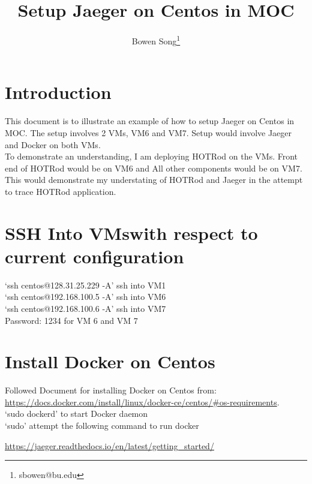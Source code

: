 \documentclass[10pt,twocolumn,letterpaper]{article}
\begin{document}
\title{Setup Jaeger on Centos in MOC}
\author{Bowen Song\thanks{sbowen@bu.edu}}
\maketitle

\tableofcontents

\clearpage

\section{Introduction}
This document is to illustrate an example of how to setup Jaeger on Centos in MOC. The setup involves 2 VMs, VM6 and VM7. Setup would involve Jaeger and Docker on both VMs. \\

To demonstrate an understanding, I am deploying HOTRod on the VMs. Front end of HOTRod would be on VM6 and All other components would be on VM7.\\

This would demonstrate my understating of HOTRod and Jaeger in the attempt to trace HOTRod application. \\
\section{SSH Into VMswith respect to current configuration}
`ssh centos@128.31.25.229 -A' ssh into VM1\\
`ssh centos@192.168.100.5 -A' ssh into VM6\\
`ssh centos@192.168.100.6 -A' ssh into VM7\\
Password: 1234 for VM 6 and VM 7\\
\section{Install Docker on Centos}
Followed Document for installing Docker on Centos from:
\url{https://docs.docker.com/install/linux/docker-ce/centos/#os-requirements}.\\

`sudo dockerd' to start Docker daemon\\
`sudo' attempt the following command to run docker

\url{https://jaeger.readthedocs.io/en/latest/getting_started/}\\
\end{document}
